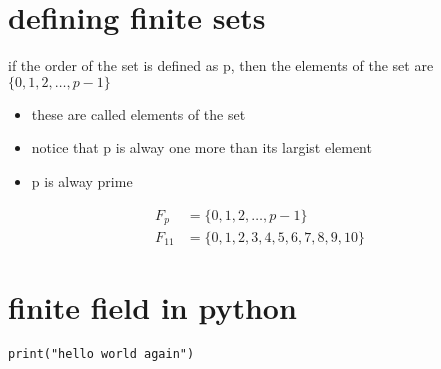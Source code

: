 \documentclass[11pt]{article}
\begin{document}
\section{defining finite sets}
\label{sec:org63cbff5}

if the order of the set is defined as p, then the elements of the set are \(\{0,1,2,\dots,p-1\}\)

\begin{itemize}
\item these are called elements of the set
\item notice that p is alway one more than its largist element
\item p is alway prime
\end{itemize}

\begin{align*}
F_p  &= \{0,1,2,\dots,p-1\}\\
F_{11} &= \{0,1,2,3,4,5,6,7,8,9,10\}
\end{align*}

\section{finite field in python}
\label{sec:org9260966}

\begin{verbatim}
print("hello world again")
\end{verbatim}
\end{document}
